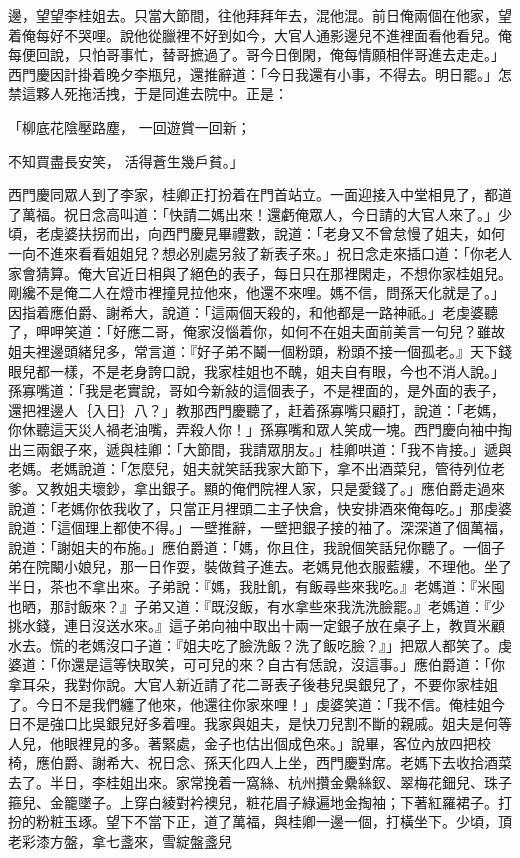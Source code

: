\begin{showcontents}{}
邊，望望李桂姐去。只當大節間，往他拜拜年去，混他混。前日俺兩個在他家，望着俺每好不哭哩。說他從臘裡不好到如今，大官人通影邊兒不進裡面看他看兒。俺每便回說，只怕哥事忙，替哥摭過了。哥今日倒閑，俺每情願相伴哥進去走走。」西門慶因計掛着晚夕李瓶兒，還推辭道：「今日我還有小事，不得去。明日罷。」怎禁這夥人死拖活拽，于是同進去院中。正是：

「柳底花陰壓路塵，  一回遊賞一回新；

不知買盡長安笑，  活得蒼生幾戶貧。」

西門慶同眾人到了李家，桂卿正打扮着在門首站立。一面迎接入中堂相見了，都道了萬福。祝日念高叫道：「快請二媽出來！還虧俺眾人，今日請的大官人來了。」少頃，老虔婆扶拐而出，向西門慶見畢禮數，說道：「老身又不曾怠慢了姐夫，如何一向不進來看看姐姐兒？想必別處另敍了新表子來。」祝日念走來插口道：「你老人家會猜算。俺大官近日相與了絕色的表子，每日只在那裡閑走，不想你家桂姐兒。剛纔不是俺二人在燈巿裡撞見拉他來，他還不來哩。媽不信，問孫天化就是了。」因指着應伯爵、謝希大，說道：「這兩個天殺的，和他都是一路神祇。」老虔婆聽了，呷呷笑道：「好應二哥，俺家沒惱着你，如何不在姐夫面前美言一句兒？雖故姐夫裡邊頭緒兒多，常言道：『好子弟不鬫一個粉頭，粉頭不接一個孤老。』天下錢眼兒都一樣，不是老身誇口說，我家桂姐也不醜，姐夫自有眼，今也不消人說。」孫寡嘴道：「我是老實說，哥如今新敍的這個表子，不是裡面的，是外面的表子，還把裡邊人｛入日｝八？」教那西門慶聽了，赶着孫寡嘴只顧打，說道：「老媽，你休聽這天災人禍老油嘴，弄殺人你！」孫寡嘴和眾人笑成一塊。西門慶向袖中掏出三兩銀子來，遞與桂卿：「大節間，我請眾朋友。」桂卿哄道：「我不肯接。」遞與老媽。老媽說道：「怎麼兒，姐夫就笑話我家大節下，拿不出酒菜兒，管待列位老爹。又教姐夫壞鈔，拿出銀子。顯的俺們院裡人家，只是愛錢了。」應伯爵走過來說道：「老媽你依我收了，只當正月裡頭二主子快倉，快安排酒來俺每吃。」那虔婆說道：「這個理上都使不得。」一壁推辭，一壁把銀子接的袖了。深深道了個萬福，說道：「謝姐夫的布施。」應伯爵道：「媽，你且住，我說個笑話兒你聽了。一個子弟在院闞小娘兒，那一日作耍，裝做貧子進去。老媽見他衣服藍縷，不理他。坐了半日，茶也不拿出來。子弟說：『媽，我肚飢，有飯尋些來我吃。』老媽道：『米囤也晒，那討飯來？』子弟又道：『既沒飯，有水拿些來我洗洗臉罷。』老媽道：『少挑水錢，連日沒送水來。』這子弟向袖中取出十兩一定銀子放在桌子上，教買米顧水去。慌的老媽沒口子道：『姐夫吃了臉洗飯？洗了飯吃臉？』」把眾人都笑了。虔婆道：「你還是這等快取笑，可可兒的來？自古有恁說，沒這事。」應伯爵道：「你拿耳朵，我對你說。大官人新近請了花二哥表子後巷兒吳銀兒了，不要你家桂姐了。今日不是我們纏了他來，他還往你家來哩！」虔婆笑道：「我不信。俺桂姐今日不是強口比吳銀兒好多着哩。我家與姐夫，是快刀兒割不斷的親戚。姐夫是何等人兒，他眼裡見的多。著緊處，金子也估出個成色來。」說畢，客位內放四把校椅，應伯爵、謝希大、祝日念、孫天化四人上坐，西門慶對席。老媽下去收拾酒菜去了。半日，李桂姐出來。家常挽着一窩絲、杭州攢金纍絲釵、翠梅花鈿兒、珠子箍兒、金籠墜子。上穿白綾對衿襖兒，粧花眉子綠遍地金掏袖；下著紅羅裙子。打扮的粉粧玉琢。望下不當下正，道了萬福，與桂卿一邊一個，打橫坐下。少頃，頂老彩漆方盤，拿七盞來，雪綻盤盞兒
\end{showcontents}
